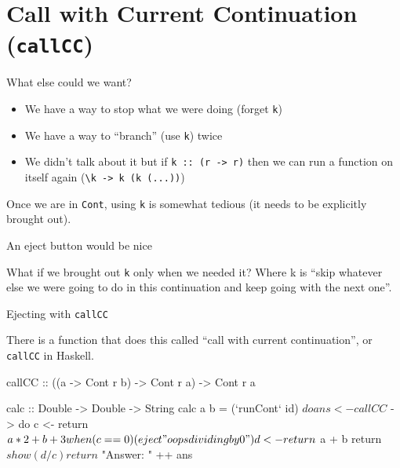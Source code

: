 \documentclass[ignorenonframetext,]{beamer}
\begin{document}
\section{Call with Current Continuation
(\texttt{callCC})}\label{call-with-current-continuation-callcc}

\begin{frame}{What else could we want?}

\begin{itemize}
\itemsep1pt\parskip0pt
\item
  We have a way to stop what we were doing (forget \texttt{k})
\item
  We have a way to ``branch'' (use \texttt{k}) twice
\item
  We didn't talk about it but if \texttt{k :: (r -\textgreater{} r)}
  then we can run a function on itself again
  (\texttt{\textbackslash{}k -\textgreater{} k (k (...))})
\end{itemize}

Once we are in \texttt{Cont}, using \texttt{k} is somewhat tedious (it
needs to be explicitly brought out).

\end{frame}

\begin{frame}{An eject button would be nice}

What if we brought out \texttt{k} only when we needed it? Where k is
``skip whatever else we were going to do in this continuation and keep
going with the next one''.

\end{frame}

\begin{frame}[fragile]{Ejecting with \texttt{callCC}}

There is a function that does this called ``call with current
continuation'', or \texttt{callCC} in Haskell.

\begin{haskellcode}
callCC :: ((a -> Cont r b) -> Cont r a) -> Cont r a

calc :: Double -> Double -> String
calc a b = (`runCont` id) $ do

  ans <- callCC $ \eject -> do
           c <- return $ a*2 + b + 3
           when (c == 0) (eject "oops dividing by 0")
           d <- return $ a + b
           return $ show (d / c)

  return $ "Answer: " ++ ans
\end{haskellcode}

\end{frame}
\end{document}
